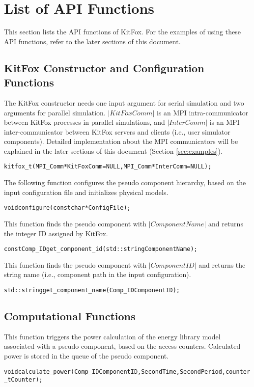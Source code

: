 \section{List of API Functions} \label{sec:list_of_api_functions}
\noindent
This section lists the API functions of KitFox.
For the examples of using these API functions, refer to the later sections of this document.

\subsection{KitFox Constructor and Configuration Functions} \label{subsec:kitfox_configuration_functions}
\noindent
The KitFox constructor needs one input argument for serial simulation and two arguments for parallel simulation.
$|KitFoxComm|$ is an MPI intra-communicator between KitFox processes in parallel simulations, and $|InterComm|$ is an MPI inter-communicator between KitFox servers and clients (i.e., user simulator components).
Detailed implementation about the MPI communicators will be explained in the later sections of this document (Section \ref{sec:examples}).
{
\fontsize{10pt}{11pt}\selectfont
\begin{alltt}
kitfox_t(MPI_Comm *KitFoxComm = NULL, MPI_Comm *InterComm = NULL);
\end{alltt}
}

\noindent
The following function configures the pseudo component hierarchy, based on the input configuration file and initializes physical models.
{
\fontsize{10pt}{11pt}\selectfont
\begin{alltt}
void configure(const char *ConfigFile);
\end{alltt}
}

\noindent
This function finds the pseudo component with $|ComponentName|$ and returns the integer ID assigned by KitFox.
{
\fontsize{10pt}{11pt}\selectfont
\begin{alltt}
const Comp_ID get_component_id(std::string ComponentName);
\end{alltt}
}

\noindent
This function finds the pseudo component with $|ComponentID|$ and returns the string name (i.e., component path in the input configuration).
{
\fontsize{10pt}{11pt}\selectfont
\begin{alltt}
std::string get_component_name(Comp_ID ComponentID);
\end{alltt}
}

\subsection{Computational Functions} \label{subsec:computational_functions}
\noindent
This function triggers the power calculation of the energy library model associated with a pseudo component, based on the access counters. Calculated power is stored in the queue of the pseudo component.
{
\fontsize{10pt}{11pt}\selectfont
\begin{alltt}
void calculate_power(Comp_ID ComponentID, Second Time, Second Period, counter_t Counter);
\end{alltt}
}

